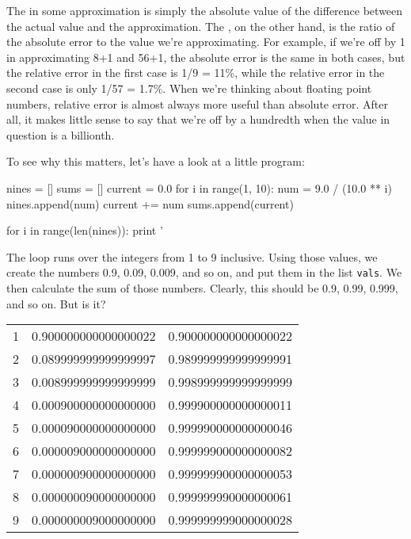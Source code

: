\documentclass{book}
\begin{document}
The  in some approximation is
simply the absolute value of the difference between the actual value and
the approximation. The , on
the other hand, is the ratio of the absolute error to the value we're
approximating. For example, if we're off by 1 in approximating 8+1 and
56+1, the absolute error is the same in both cases, but the relative
error in the first case is 1/9 = 11\%, while the relative error in the
second case is only 1/57 = 1.7\%. When we're thinking about floating
point numbers, relative error is almost always more useful than absolute
error. After all, it makes little sense to say that we're off by a
hundredth when the value in question is a billionth.

To see why this matters, let's have a look at a little program:

\begin{VerbIn}
nines = []
sums = []
current = 0.0
for i in range(1, 10):
    num = 9.0 / (10.0 ** i)
    nines.append(num)
    current += num
    sums.append(current)

for i in range(len(nines)):
    print '%
\end{VerbIn}

The loop runs over the integers from 1 to 9 inclusive. Using those
values, we create the numbers 0.9, 0.09, 0.009, and so on, and put them
in the list \texttt{vals}. We then calculate the sum of those numbers.
Clearly, this should be 0.9, 0.99, 0.999, and so on. But is it?

\begin{tabular}{lll}
1 & 0.900000000000000022 & 0.900000000000000022 \\
2 & 0.089999999999999997 & 0.989999999999999991 \\
3 & 0.008999999999999999 & 0.998999999999999999 \\
4 & 0.000900000000000000 & 0.999900000000000011 \\
5 & 0.000090000000000000 & 0.999990000000000046 \\
6 & 0.000009000000000000 & 0.999999000000000082 \\
7 & 0.000000900000000000 & 0.999999900000000053 \\
8 & 0.000000090000000000 & 0.999999990000000061 \\
9 & 0.000000009000000000 & 0.999999999000000028 \\
\end{tabular}
\end{document}
